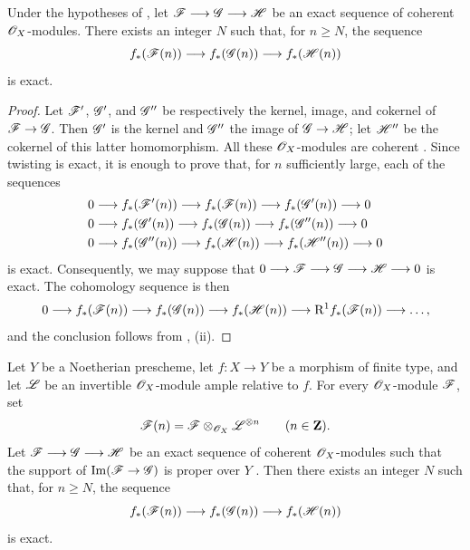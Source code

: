 \begin{corollary}[2.2.3]
\label{III.2.2.3}
Under the hypotheses of , let $\mathscr{F}\longrightarrow\mathscr{G}\longrightarrow\mathscr{H}$
be an exact sequence of coherent $\mathscr{O}_X$-modules.
There exists an integer $N$ such that, for $n\geq N$, the sequence
\[
  f_*(\mathscr{F}(n))
  \longrightarrow f_*(\mathscr{G}(n))
  \longrightarrow f_*(\mathscr{H}(n))
\]
is exact.
\end{corollary}

\begin{proof}
Let $\mathscr{F}'$, $\mathscr{G}'$, and $\mathscr{G}''$ be respectively the kernel, image, and cokernel of $\mathscr{F}\to\mathscr{G}$.
Then $\mathscr{G}'$ is the kernel and $\mathscr{G}''$ the image of $\mathscr{G}\to\mathscr{H}$; let $\mathscr{H}''$ be the cokernel of this latter homomorphism.
All these $\mathscr{O}_X$-modules are coherent .
Since twisting is exact, it is enough to prove that, for $n$ sufficiently large, each of the sequences
\begin{align*}
  0&\longrightarrow f_*(\mathscr{F}'(n))
    \longrightarrow f_*(\mathscr{F}(n))
    \longrightarrow f_*(\mathscr{G}'(n))
    \longrightarrow0\\
  0&\longrightarrow f_*(\mathscr{G}'(n))
    \longrightarrow f_*(\mathscr{G}(n))
    \longrightarrow f_*(\mathscr{G}''(n))
    \longrightarrow0\\
  0&\longrightarrow f_*(\mathscr{G}''(n))
    \longrightarrow f_*(\mathscr{H}(n))
    \longrightarrow f_*(\mathscr{H}''(n))
    \longrightarrow0
\end{align*}
is exact.
Consequently, we may suppose that $0\longrightarrow\mathscr{F}\longrightarrow\mathscr{G}
\longrightarrow\mathscr{H}\longrightarrow0$
is exact.
The cohomology sequence is then
\[
  0\longrightarrow f_*(\mathscr{F}(n))
  \longrightarrow f_*(\mathscr{G}(n))
  \longrightarrow f_*(\mathscr{H}(n))
  \longrightarrow \mathrm{R}^1f_*(\mathscr{F}(n))
  \longrightarrow\ldots,
\]
and the conclusion follows from , (ii).
\end{proof}


\begin{corollary}[2.2.4]
\label{III.2.2.4}
Let $Y$ be a Noetherian prescheme, let $f:X\to Y$ be a morphism of finite type, and let $\mathscr{L}$ be an invertible $\mathscr{O}_X$-module ample relative to $f$.
For every $\mathscr{O}_X$-module $\mathscr{F}$, set
\[
  \mathscr{F}(n)=\mathscr{F}\otimes_{\mathscr{O}_X}\mathscr{L}^{\otimes n}
  \qquad(n\in\mathbf{Z}).
\]
Let $\mathscr{F}\longrightarrow\mathscr{G}\longrightarrow\mathscr{H}$
be an exact sequence of coherent $\mathscr{O}_X$-modules such that the support of $\operatorname{Im}(\mathscr{F}\to\mathscr{G})$ is proper over $Y$ .
Then there exists an integer $N$ such that, for $n\geq N$, the sequence
\[
  f_*(\mathscr{F}(n))
  \longrightarrow f_*(\mathscr{G}(n))
  \longrightarrow f_*(\mathscr{H}(n))
\]
is exact.
\end{corollary}


